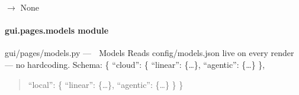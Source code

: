 \documentclass[letterpaper,10pt,english]{sphinxmanual}
\begin{document}
\begin{fulllineitems}
\label{\detokenize{gui.pages.ml_features_page:gui.pages.ml_features_page.render}}
\pysigstartsignatures
\pysiglinewithargsret
{}
{}
{{ $\rightarrow$ None}}
\pysigstopsignatures
\end{fulllineitems}


\sphinxstepscope


\paragraph{gui.pages.models module}
\label{\detokenize{gui.pages.models:module-gui.pages.models}}\label{\detokenize{gui.pages.models:gui-pages-models-module}}\label{\detokenize{gui.pages.models::doc}}
\sphinxAtStartPar
gui/pages/models.py  —  🍎 Models
Reads config/models.json live on every render — no hardcoding.
Schema:  \{ “cloud”: \{ “linear”: \{…\}, “agentic”: \{…\} \},
\begin{quote}

\sphinxAtStartPar
“local”:  \{ “linear”: \{…\}, “agentic”: \{…\} \} \}
\end{quote}

\begin{fulllineitems}
\label{\detokenize{gui.pages.models:gui.pages.models.render}}
\pysigstartsignatures
\pysiglinewithargsret
{}
{}
{}
\pysigstopsignatures
\end{fulllineitems}


\sphinxstepscope
\end{document}

